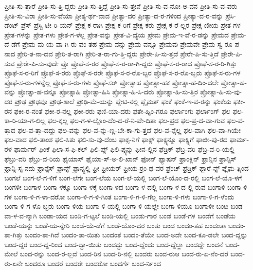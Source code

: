 {ಪ್ರೀತಿ-ಸು-ತ್ತಾರೆ
ಪ್ರೀತಿ-ಸು-ತ್ತಿ-ದ್ದರು
ಪ್ರೀತಿ-ಸು-ತ್ತಿದ್ದೆ
ಪ್ರೀತಿ-ಸು-ತ್ತೇನೆ
ಪ್ರೀತಿ-ಸು-ವ-ನೋ-ಅ-ವನ
ಪ್ರೀತಿ-ಸು-ವ-ವರು
ಪ್ರೀತಿ-ಸು-ವಿರಾ
ಪ್ರೀತಿ-ಸು-ವೆಯಾ
ಪ್ರೀತ್ಯ-ರ್ಥ-ವಾದ
ಪ್ರೀತ್ಯಾ-ದರ
ಪ್ರೀತ್ಯಾ-ದ-ರ-ಗಳಿಂದ
ಪ್ರೀತ್ಯಾ-ದ-ರ-ವನ್ನು
ಪ್ರೆಸಿ-ಡೆಂಟ್
ಪ್ರೆಸ್
ಪ್ರೆಸ್ಬಿ-ಟೀ-ರಿ-ಯನ್
ಪ್ರೇಕ್ಷ-ಕ-ರಾಗಿ
ಪ್ರೇಕ್ಷ-ಕ-ರಿಗೆ
ಪ್ರೇಕ್ಷ-ಕರು
ಪ್ರೇಕ್ಷ-ಕ-ರೆ-ಲ್ಲರ
ಪ್ರೇಕ್ಷ-ಣೀಯ
ಪ್ರೇತ-ಗಳ
ಪ್ರೇತ-ಗಳನ್ನು
ಪ್ರೇತ-ಗಳು
ಪ್ರೇತ-ಗ-ಳೆಲ್ಲ
ಪ್ರೇತ-ವನ್ನು
ಪ್ರೇತ-ವಿ-ದ್ಯೆಯ
ಪ್ರೇಮ
ಪ್ರೇಮ-ಇ-ವೆ-ರ-ಡನ್ನು
ಪ್ರೇಮದ
ಪ್ರೇಮ-ದೆ-ಡೆಗೆ
ಪ್ರೇಮ-ಮ-ಯ-ವಾ-ಗಿ-ರು-ವಂ-ತಹ
ಪ್ರೇಮ-ವನ್ನು
ಪ್ರೇಮ-ವನ್ನೂ
ಪ್ರೇಮವು
ಪ್ರೇಮವೇ
ಪ್ರೇಮ-ಸ್ವ-ರೂ-ಪ-ನಾದ
ಪ್ರೇರಿ-ತ-ನಾ-ದವ
ಪ್ರೇರಿ-ತ-ರಾಗಿ
ಪ್ರೇರಿ-ತ-ರಾ-ಗು-ತ್ತಿ-ದ್ದರು
ಪ್ರೇರೇ-ಪಿ-ಸು-ತ್ತದೆ
ಪ್ರೇರೇ-ಪಿ-ಸು-ತ್ತಿದೆ
ಪ್ರೇರೇ-ಪಿ-ಸುವ
ಪ್ರೇರೇ-ಪಿ-ಸು-ವುದೇ
ಪ್ರೊ
ಪ್ರೊಫೆ-ಸ-ರರ
ಪ್ರೊಫೆ-ಸ-ರ-ರಾ-ಗಿ-ದ್ದರು
ಪ್ರೊಫೆ-ಸ-ರ-ರಾದ
ಪ್ರೊಫೆ-ಸ-ರ-ರಿ-ಗಿತ್ತು
ಪ್ರೊಫೆ-ಸ-ರ-ರಿಗೆ
ಪ್ರೊಫೆ-ಸ-ರರು
ಪ್ರೊಫೆ-ಸ-ರರೇ
ಪ್ರೊಫೆ-ಸ-ರ-ರೊ-ಬ್ಬರ
ಪ್ರೊಫೆ-ಸ-ರ-ರೊ-ಬ್ಬರು
ಪ್ರೊಫೆ-ಸ-ರು-ಗಳ
ಪ್ರೊಫೆ-ಸ-ರು-ಗಳನ್ನೆಲ್ಲ
ಪ್ರೊಫೆ-ಸ-ರು-ಗಳು
ಪ್ರೊಫೆ-ಸರ್
ಪ್ರೋತ್ಸಾಹ
ಪ್ರೋತ್ಸಾ-ಹಕ
ಪ್ರೋತ್ಸಾ-ಹ-ದಿಂ-ದಲೇ
ಪ್ರೋತ್ಸಾ-ಹ-ವನ್ನು
ಪ್ರೋತ್ಸಾ-ಹ-ವನ್ನೂ
ಪ್ರೋತ್ಸಾಹಿ
ಪ್ರೋತ್ಸಾ-ಹಿಸಿ
ಪ್ರೋತ್ಸಾ-ಹಿ-ಸಿ-ದರು
ಪ್ರೋತ್ಸಾ-ಹಿ-ಸು-ತ್ತಿರ
ಪ್ರೋತ್ಸಾ-ಹಿ-ಸು-ವು-ದರ
ಪ್ರೌಢ
ಪ್ರೌಢವೂ
ಪ್ರೌಢ-ಶಾಲೆ
ಪ್ರೌಢಿ-ಮೆ-ಯನ್ನು
ಪ್ಲೇಟಿ-ನಲ್ಲಿ
ಪ್ಲೈಮತ್
ಫಂಕೆ
ಫಂಕೆ-ಇ-ವ-ರನ್ನು
ಫಂಕೆಯ
ಫಕೀ-ರನ
ಫಕೀ-ರ-ನಂತೆ
ಫಕೀ-ರ-ನಲ್ಲ
ಫಕೀ-ರರು
ಫಣಿ-ಯಾ-ದರು
ಫತೇ-ಹ್ಸಿಂ-ಗರೂ
ಫರ್ಲಾಂಗು
ಫರ್ಲಾಂಗ್
ಫಲ
ಫಲ-ಕಾ-ರಿ-ಯಾ-ಗ-ಲಿಲ್ಲ
ಫಲ-ಕ್ಕಲ್ಲ
ಫಲ-ಗ-ಳ-ಲ್ಲೊಂ-ದೆಂ-ದ-ರೆ-ನಿ-ವೇ-ದಿತಾ
ಫಲ-ಪ್ರದ
ಫಲ-ಪ್ರ-ದ-ವಾ-ಗುವ
ಫಲ-ವ-ತ್ತಾದ
ಫಲ-ವ-ತ್ತಾ-ದದ್ದು
ಫಲ-ವನ್ನು
ಫಲ-ವ-ನ್ನು-ಣ್ಣ-ಬೇ-ಕಾ-ಗು-ತ್ತದೆ
ಫಲ-ವ-ನ್ನೆಲ್ಲ
ಫಲ-ವಾಗಿ
ಫಲ-ವಾ-ಗಿಯೇ
ಫಲ-ವಾದ
ಫಲಿ-ತಾಂಶ
ಫಲಿ-ಸಿತು
ಫಲಿ-ಸು-ವು-ದೆಂಬ
ಫಾಕ್ಸ-ನಿಗೆ
ಫಾಕ್ಸ್
ಫಾಕ್ಸ್ನನ್ನೂ
ಫಾಕ್ಸ್ನಿಗೆ
ಫಾಜೀ-ಪು-ರದ
ಫಾರ್ಮ-ರಳ
ಫಾರ್ಮರ್
ಫಿಂಕೆ
ಫಿಲಾ-ಸ-ಫಿ-ಕಲ್
ಫಿಲಿ-ಪ್ಸ್
ಫಿಲಿ-ಪ್ಸ್ಳನ್ನು
ಫೀನ-ಲ್ಲಿನ
ಫೆಡ್ರಿಕ್
ಫೆಬ್ರ-ವರಿ
ಫೆಬ್ರ-ವ-ರಿ-ಯಲ್ಲಿ
ಫೆಬ್ರು-ವರಿ
ಫೆಬ್ರು-ವ-ರಿಯ
ಫೈಯಾಸ್
ಫೈಯಾ-ಸ್-ಅ-ಲಿ-ಖಾನ್
ಫೋನ್
ಫ್ಯಾಷನ್
ಫ್ರಾಂಕ್ಲಿನ್
ಫ್ರಾನ್ಸಿನ
ಫ್ರಾನ್ಸಿಸ್
ಫ್ರಾನ್ಸಿ-ಸ್ಸ-ನದು
ಫ್ರಾನ್ಸೆಸ್
ಫ್ರಾನ್ಸ್
ಫ್ರಾನ್ಸ್ನಲ್ಲಿ
ಫ್ರೀ
ಫ್ರೀಯರ್
ಫ್ರೀಯ-ರ್ರಂ-ಥ-ವರ
ಫ್ರೆಂಚ್
ಫ್ರೆಡ್ರಿಕ್
ಫ್ಲಾರೆ-ನ್ಸ್
ಫ್ಲೈಮ-ತ್ನಿಂದ
ಬಂಗಲೆ
ಬಂಗ-ಲೆ-ಗ-ಳಿಗೆ
ಬಂಗ-ಲೆಗೇ
ಬಂಗ-ಲೆಯ
ಬಂಗ-ಲೆ-ಯಲ್ಲಿ
ಬಂಗ-ಲೆ-ಯೊಂ-ದ-ರಲ್ಲಿ
ಬಂಗ-ಲೆ-ಯೊ-ಳಗೆ
ಬಂಗಳೀ
ಬಂಗಾಳ
ಬಂಗಾ-ಳಕ್ಕೂ
ಬಂಗಾ-ಳಕ್ಕೆ
ಬಂಗಾ-ಳದ
ಬಂಗಾ-ಳ-ದಲ್ಲಿ
ಬಂಗಾ-ಳ-ದ-ಲ್ಲಿ-ರುವ
ಬಂಗಾಳಿ
ಬಂಗಾ-ಳಿ-ಗಳ
ಬಂಗಾ-ಳಿ-ಗ-ಳಾ-ದರೋ
ಬಂಗಾ-ಳಿ-ಗ-ಳಿ-ಗಿಂತ
ಬಂಗಾ-ಳಿ-ಗ-ಳಿ-ಗೆಲ್ಲ
ಬಂಗಾ-ಳಿ-ಗಳು
ಬಂಗಾ-ಳಿ-ಗ-ಳೆಂದು
ಬಂಗಾ-ಳಿ-ಗ-ಳೊ-ಬ್ಬರು
ಬಂಗಾ-ಳಿಯ
ಬಂಗಾ-ಳಿ-ಯಲ್ಲಿ
ಬಂಗಾ-ಳಿ-ಯಲ್ಲೇ
ಬಂಗಾ-ಳಿಯೂ
ಬಂಗಾಳೀ
ಬಂಟ
ಬಂಡ-ವಾ-ಳ-ವ-ನ್ನಾಗಿ
ಬಂಡಾ-ಯದ
ಬಂಡಿ-ಗ-ಟ್ಟಲೆ
ಬಂಡಿ-ಯಲ್ಲಿ
ಬಂಡು-ಗಾರ
ಬಂಡೆ
ಬಂಡೆ-ಗಳ
ಬಂಡೆಗೆ
ಬಂಡೆಯ
ಬಂಡೆ-ಯನ್ನು
ಬಂಡೆ-ಯ-ನ್ನೇರಿ
ಬಂಡೆ-ಯೆ-ಡೆಗೆ
ಬಂಡೆ-ಯೊಂ-ದರ
ಬಂತು
ಬಂದ
ಬಂದಂ-ತಹ
ಬಂದಂತಾ
ಬಂದಂ-ತಾ-ಗಿತ್ತು
ಬಂದಂ-ತಾ-ಗಿದೆ
ಬಂದಂ-ತಾ-ಯಿತು
ಬಂದಂತೆ
ಬಂದಂ-ತೆಯೇ
ಬಂದ-ಅದೇ
ಬಂದ-ಕೂ-ಡಲೇ
ಬಂದ-ದ್ದನ್ನು
ಬಂದ-ದ್ದರ
ಬಂದ-ದ್ದ-ರಿಂದ
ಬಂದ-ದ್ದಾ-ಯಿತು
ಬಂದದ್ದು
ಬಂದ-ದ್ದೆಂದು
ಬಂದ-ದ್ದೆಲ್ಲಾ
ಬಂದದ್ದೇ
ಬಂದನೆ
ಬಂದ-ಮೇಲೆ
ಬಂದ-ರನ್ನು
ಬಂದ-ರ-ಲ್ಲದೆ
ಬಂದ-ರಿನ
ಬಂದ-ರಿ-ನಲ್ಲಿ
ಬಂದರು
ಬಂದ-ರುಆ
ಬಂದ-ರು-ಏ-ನೆಂ-ದರೆ
ಬಂದ-ರು-ಏನೇ
ಬಂದರೂ
ಬಂದರೆ
ಬಂದರೇ
ಬಂದರೋ
ಬಂದರ್ಗೆ
ಬಂದ-ರ್ನಿಂದ
}

